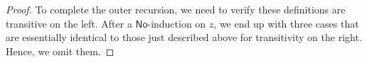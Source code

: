 \documentclass[10pt,a4paper]{article}
\newcommand{\NO}{\ensuremath{\mathsf{No}}\xspace}
\theoremstyle{definition}
\theoremstyle{remark}
\numberwithin{equation}{section}
\begin{document}
\begin{proof}
  To complete the outer recursion, we need to verify these definitions are transitive on the left.
  After a $\NO$-induction on $z$, we end up with three cases that are essentially identical to those just described above for transitivity on the right.
  Hence, we omit them.
\end{proof}



\end{document}
